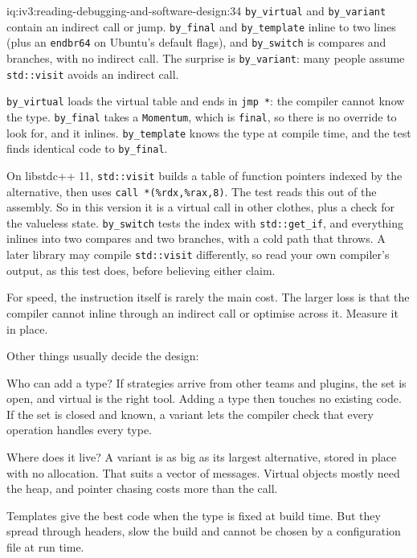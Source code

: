 \begin{solution}{iq:iv3:reading-debugging-and-software-design:34}
\texttt{by\_virtual} and \texttt{by\_variant} contain an indirect call or jump. \texttt{by\_final} and \texttt{by\_template} inline to two lines (plus an \texttt{endbr64} on Ubuntu's default flags), and \texttt{by\_switch} is compares and branches, with no indirect call. The surprise is \texttt{by\_variant}: many people assume \texttt{std::visit} avoids an indirect call.

\texttt{by\_virtual} loads the virtual table and ends in \texttt{jmp *}: the compiler cannot know the type. \texttt{by\_final} takes a \texttt{Momentum}, which is \texttt{final}, so there is no override to look for, and it inlines. \texttt{by\_template} knows the type at compile time, and the test finds identical code to \texttt{by\_final}.

On libstdc++ 11, \texttt{std::visit} builds a table of function pointers indexed by the alternative, then uses \texttt{call *(\%rdx,\%rax,8)}. The test reads this out of the assembly. So in this version it is a virtual call in other clothes, plus a check for the valueless state. \texttt{by\_switch} tests the index with \texttt{std::get\_if}, and everything inlines into two compares and two branches, with a cold path that throws. A later library may compile \texttt{std::visit} differently, so read your own compiler's output, as this test does, before believing either claim.

For speed, the instruction itself is rarely the main cost. The larger loss is that the compiler cannot inline through an indirect call or optimise across it. Measure it in place.

Other things usually decide the design:

Who can add a type? If strategies arrive from other teams and plugins, the set is open, and virtual is the right tool. Adding a type then touches no existing code. If the set is closed and known, a variant lets the compiler check that every operation handles every type.

Where does it live? A variant is as big as its largest alternative, stored in place with no allocation. That suits a vector of messages. Virtual objects mostly need the heap, and pointer chasing costs more than the call.

Templates give the best code when the type is fixed at build time. But they spread through headers, slow the build and cannot be chosen by a configuration file at run time.


\end{solution}

